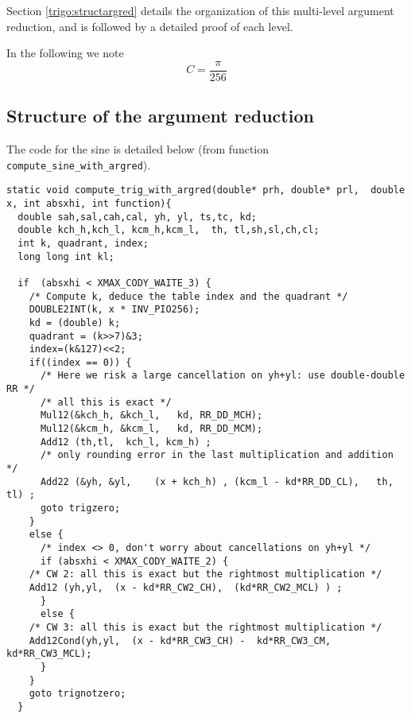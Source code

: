 Section \ref{trigo:structargred} details the organization of this
multi-level argument reduction, and is followed by a detailed proof of
each level.


In the following we note $$C=\frac{\pi}{256}$$


\subsection{Structure of the argument reduction
  \label{trigo:structargred}}
The code for the sine is detailed below (from function \verb!compute_sine_with_argred!).

\begin{lstlisting}[caption={Multilevel argument reduction},firstnumber=1]
static void compute_trig_with_argred(double* prh, double* prl,  double x, int absxhi, int function){ 
  double sah,sal,cah,cal, yh, yl, ts,tc, kd; 
  double kch_h,kch_l, kcm_h,kcm_l,  th, tl,sh,sl,ch,cl;
  int k, quadrant, index;
  long long int kl;

  if  (absxhi < XMAX_CODY_WAITE_3) {
    /* Compute k, deduce the table index and the quadrant */
    DOUBLE2INT(k, x * INV_PIO256);
    kd = (double) k;
    quadrant = (k>>7)&3;      
    index=(k&127)<<2;
    if((index == 0)) { 
      /* Here we risk a large cancellation on yh+yl: use double-double RR */
      /* all this is exact */
      Mul12(&kch_h, &kch_l,   kd, RR_DD_MCH);
      Mul12(&kcm_h, &kcm_l,   kd, RR_DD_MCM);
      Add12 (th,tl,  kch_l, kcm_h) ;
      /* only rounding error in the last multiplication and addition */ 
      Add22 (&yh, &yl,    (x + kch_h) , (kcm_l - kd*RR_DD_CL),   th, tl) ;
      goto trigzero;
    } 
    else {      
      /* index <> 0, don't worry about cancellations on yh+yl */
      if (absxhi < XMAX_CODY_WAITE_2) {
	/* CW 2: all this is exact but the rightmost multiplication */
	Add12 (yh,yl,  (x - kd*RR_CW2_CH),  (kd*RR_CW2_MCL) ) ; 
      }
      else { 
	/* CW 3: all this is exact but the rightmost multiplication */
	Add12Cond(yh,yl,  (x - kd*RR_CW3_CH) -  kd*RR_CW3_CM,   kd*RR_CW3_MCL);
      }
    }
    goto trignotzero;
  }


\end{lstlisting}
